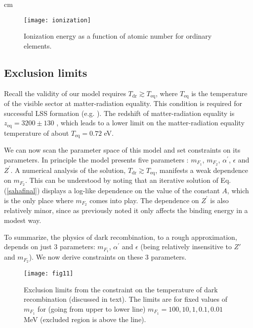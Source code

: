 \documentclass[12pt]{article}
\begin{document}
 cm

%
\begin{figure}[htpb]
    \centering
        \texttt{[image: ionization]}
    \caption{Ionization energy as a function of atomic number for ordinary elements.}
    \label{fig:Ionization}
\end{figure}
%
\newpage

\subsection{Exclusion limits}

Recall the validity of our model requires $T _{\text{dr}} \gtrsim T _{\text{eq}}$, where $T _{\text{eq}}$ is the temperature of the visible sector at matter-radiation equality. This condition is required for successful LSS formation (e.g. \cite{volkaspetraki}). The redshift of matter-radiation equality is $z _{\text{eq}} = 3200 \pm 130$ \cite{pdg}, which leads to a lower limit on the matter-radiation equality temperature of about $T _{\text{eq}} = 0.72$ eV.

We can now scan the parameter space of this model and set constraints on its parameters. In principle the model presents five parameters : $m _{F_1}$, $m _{F_2}$, $\alpha ^{'}$, $\epsilon$ and $Z ^{'}$. A numerical analysis of the solution, $T _{\text{dr}} \gtrsim T _{\text{eq}}$, manifests a weak dependence on $m _{F_2}$. This can be understood by noting that an iterative solution of Eq.(\ref{sahafinal}) displays a log-like dependence on the value of the constant $A$, which is the only place where $m _{F_2}$ comes into play. The dependence on $Z ^{'}$ is also relatively minor, since as previously noted it only affects the binding energy in a modest way.

To summarize, the physics of dark recombination, to a rough approximation, depends on just 3 parameters: $m _{F_1}$, $\alpha ^{'}$ and $\epsilon$ (being relatively insensitive to $Z'$ and $m _{F_2}$). We now derive constraints on these 3 parameters.

\begin{figure}[htpb]
    \centering
        \texttt{[image: fig11]}
    \caption{Exclusion limits from the constraint on the temperature of dark recombination (discussed in text). The limits are for fixed values of $m _{F_1}$ for (going from upper to lower line) $m _{F_1} = 100, 10, 1, 0.1, 0.01$ MeV (excluded region is above the line).}
    \label{fig:Exclusion dark recombination mf1}
\vskip 1cm
\end{figure}
\end{document}

